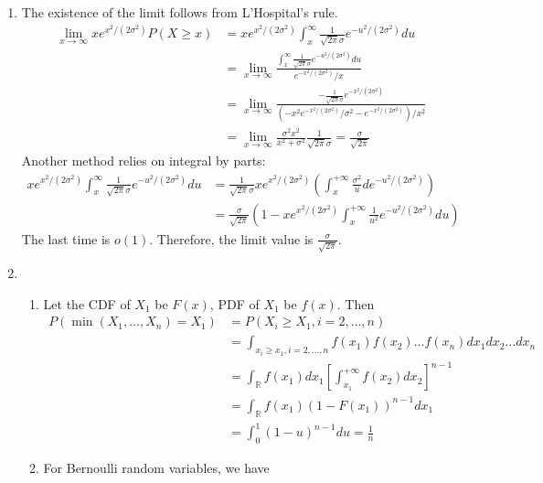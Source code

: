 \documentclass{article}
\begin{document}
\begin{enumerate}
\begin{enumerate}
\end{enumerate}
\item The existence of the limit follows
from L'Hospital's rule. 
\begin{align*}
    \lim_{x \to \infty} x e^{x^2/(2\sigma^2)}
    P(X\geq x) & = x e^{x^2/(2\sigma^2)}
    \int_{x}^{\infty} \frac{1}{\sqrt{2\pi}\sigma}
    e^{-u^2/(2\sigma^2)}du \\
        & = 
   \lim_{x \to \infty} \frac{ \int_{x}^{\infty} \frac{1}{\sqrt{2\pi}\sigma}
    e^{-u^2/(2\sigma^2)} du}
    {e^{-x^2/(2\sigma^2)} / x} \\
    &= \lim_{x \to \infty} \frac{ - \frac{1}{\sqrt{2\pi}\sigma}
    e^{-x^2/(2\sigma^2)}}
    {(-x^2e^{-x^2/(2\sigma^2)} / \sigma^2 -e^{-x^2/(2\sigma^2)} )/ x^2} \\
    &= \lim_{x \to \infty} \frac{\sigma^2x^2}{x^2+\sigma^2} \frac{1}{\sqrt{2\pi}\sigma}=\frac{\sigma}{\sqrt{2\pi}}
\end{align*}
Another method relies on integral by parts:
\begin{align*}
    x e^{x^2/(2\sigma^2)}
    \int_{x}^{\infty} \frac{1}{\sqrt{2\pi}\sigma}
    e^{-u^2/(2\sigma^2)}du &=\frac{1}{\sqrt{2\pi}\sigma}x e^{x^2/(2\sigma^2)}
    (\int_x^{+\infty} \frac{\sigma^2}{u} de^{-u^2/(2\sigma^2)})\\
    & = \frac{\sigma}{\sqrt{2\pi}}\left(1-xe^{x^2/(2\sigma^2)}
    \int_x^{+\infty} \frac{1}{u^2}e^{-u^2/(2\sigma^2)}du\right)
\end{align*}
The last time is $o(1)$. Therefore, the limit value is
$\frac{\sigma}{\sqrt{2\pi}}$.
\item
\begin{enumerate}[label=(\roman*)]
    \item Let the CDF of $X_1$ be $F(x)$,
    PDF of $X_1$ be $f(x)$.
    Then
    \begin{align*}
        P(\min(X_1, \dots, X_n) = X_1)
        &= P(X_i \geq X_1, i=2,\dots,n) \\
        &=\int_{x_i \geq x_1, i=2,\dots,n}
        f(x_1)f(x_2) \dots f(x_n) dx_1dx_2\dots dx_n \\
        & = \int_{\mathbb{R}}
        f(x_1)dx_1 \left[\int_{x_1}^{+\infty} f(x_2)dx_2\right]^{n-1} \\
        & =  \int_{\mathbb{R}}
        f(x_1)(1-F(x_1))^{n-1}dx_1  \\
        & = \int_{0}^1 (1-u)^{n-1}du = \frac{1}{n}
    \end{align*}
    \item For Bernoulli random variables, we have

\end{enumerate}
\end{enumerate}
\end{document}
